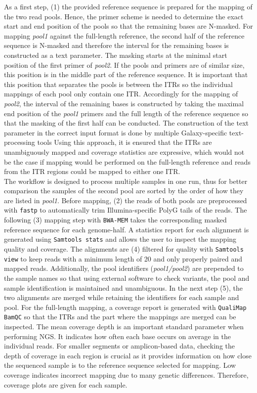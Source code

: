 As a first step, (1) the provided reference sequence is prepared for the mapping of the two read pools. Hence, the primer scheme is needed to determine the exact start and end position of the pools so that the remaining bases are N-masked. For mapping \textit{pool1} against the full-length reference, the second half of the reference sequence is N-masked and therefore the interval for the remaining bases is constructed as a text parameter. The masking starts at the minimal start position of the first primer of \textit{pool2}. If the pools and primers are of similar size, this position is in the middle part of the reference sequence. It is important that this position that separates the pools is between the \acp{ITR} so the individual mappings of each pool only contain one \ac{ITR}. Accordingly for the mapping of \textit{pool2}, the interval of the remaining bases is constructed by taking the maximal end position of the \textit{pool1} primers and the full length of the reference sequence so that the masking of the first half can be conducted. The construction of the text parameter in the correct input format is done by multiple Galaxy-specific text-processing tools%
Using this approach, it is ensured that the \acp{ITR} are unambiguously mapped and coverage statistics are expressive, which would not be the case if mapping would be performed on the full-length reference and reads from the \ac{ITR} regions could be mapped to either one \ac{ITR}. \\
The workflow is designed to process multiple samples in one run, thus for better comparison the samples of the second pool are sorted by the order of how they are listed in \textit{pool1}. Before mapping, (2) the reads of both pools are preprocessed with \texttt{fastp} to automatically trim Illumina-specific PolyG tails of the reads. The following (3) mapping step with \texttt{BWA-MEM} takes the corresponding masked reference sequence for each genome-half. A statistics report for each alignment is generated using \texttt{Samtools stats} and allows the user to inspect the mapping quality and coverage. The alignments are (4) filtered for quality with \texttt{Samtools view} to keep reads with a minimum length of 20 and only properly paired and mapped reads. Additionally, the pool identifiers (\textit{pool1/pool2}) are prepended to the sample names so that using external software to check variants, the pool and sample identification is maintained and unambiguous. In the next step (5), the two alignments are merged while retaining the identifiers for each sample and pool. For the full-length mapping, a coverage report is generated with \texttt{QualiMap BamQC} so that the \acp{ITR} and the part where the mappings are merged can be inspected. The mean coverage depth is an important standard parameter when performing NGS. It indicates how often each base occurs on average in the individual reads. For smaller segments or amplicon-based data, checking the depth of coverage in each region is crucial as it provides information on how close the sequenced sample is to the reference sequence selected for mapping. Low coverage indicates incorrect mapping due to many genetic differences. Therefore, coverage plots are given for each sample. \\
